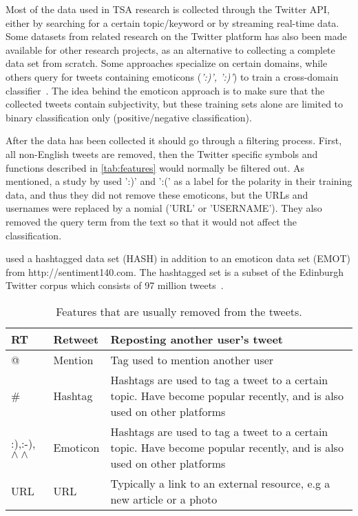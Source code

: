 Most of the data used in TSA research is collected through the Twitter API, either by searching for a certain topic/keyword or by streaming real-time data. Some datasets from related research on the Twitter platform has also been made available for other research projects, as an alternative to collecting a complete data set from scratch. Some approaches specialize on certain domains, while others query for tweets containing emoticons (\emph{':)', ':)'}) to train a cross-domain classifier~\citep{article:go}. The idea behind the emoticon approach is to make sure that the collected tweets contain subjectivity, but these training sets alone are limited to binary classification only (positive/negative classification).

After the data has been collected it should go through a filtering process. First, all non-English tweets are removed, then the Twitter specific symbols and functions described in \autoref{tab:features} would normally be filtered out. As mentioned, a study by \cite{article:go} used ':)' and ':(' as a label for the polarity in their training data, and thus they did not remove these emoticons, but the URLs and usernames were replaced by a nomial ('URL' or 'USERNAME'). They also removed the query term from the text so that it would not affect the classification.

\cite{article:omg} used a hashtagged data set (HASH) in addition to an emoticon data set (EMOT) from http://sentiment140.com. The hashtagged set is a subset of the Edinburgh Twitter corpus which consists of 97 million tweets~\citep{article:edinburgh}.

\begin{table}[]
\centering
\begin{tabular}{|l|l|p{8cm}|}
\hline
RT & Retweet & Reposting another user's tweet \\ \hline
@ & Mention & Tag used to mention another user \\ \hline
\# & Hashtag & Hashtags are used to tag a tweet to a certain topic. Have become popular recently, and is also used on other platforms \\ \hline
:),:-),$\wedge\wedge$ & Emoticon & Hashtags are used to tag a tweet to a certain topic. Have become popular recently, and is also used on other platforms \\ \hline
URL & URL & Typically a link to an external resource, e.g a new article or a photo \\ \hline
\end{tabular}
\caption{Features that are usually removed from the tweets.}
\label{tab:features}
\end{table}

